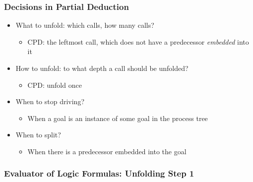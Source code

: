 \documentclass[xcolor=table]{beamer}
\begin{document}
\begin{frame}[fragile]
  \frametitle{Decisions in Partial Deduction}
\begin{itemize}
  \item What to unfold: which calls, how many calls?
  \begin{itemize}
    \item CPD: the leftmost call, which does not have a predecessor \emph{embedded} into it
  \end{itemize}
  \item How to unfold: to what depth a call should be unfolded?
  \begin{itemize}
    \item CPD: unfold once
  \end{itemize}
  \item When to stop driving?
  \begin{itemize}
    \item When a goal is an instance of some goal in the process tree
  \end{itemize}
  \item When to split?
  \begin{itemize}
    \item When there is a predecessor embedded into the goal
  \end{itemize}
\end{itemize}
\end{frame}

\begin{frame}[fragile]
  \frametitle{Evaluator of Logic Formulas: Unfolding Step 1}


\end{frame}
\end{document}
